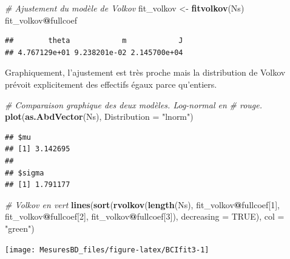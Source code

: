 \documentclass[
  11pt,
  french,
  a4paper,
  extrafontsizes,onecolumn,openright
  ]{memoir}
\newenvironment{Shaded}{\begin{snugshade}}{\end{snugshade}}
\newcommand{\AttributeTok}[1]{\textcolor[rgb]{0.13,0.29,0.53}{#1}}
\newcommand{\CommentTok}[1]{\textcolor[rgb]{0.56,0.35,0.01}{\textit{#1}}}
\newcommand{\ConstantTok}[1]{\textcolor[rgb]{0.56,0.35,0.01}{#1}}
\newcommand{\DecValTok}[1]{\textcolor[rgb]{0.00,0.00,0.81}{#1}}
\newcommand{\FunctionTok}[1]{\textcolor[rgb]{0.13,0.29,0.53}{\textbf{#1}}}
\newcommand{\NormalTok}[1]{#1}
\newcommand{\OtherTok}[1]{\textcolor[rgb]{0.56,0.35,0.01}{#1}}
\newcommand{\SpecialCharTok}[1]{\textcolor[rgb]{0.81,0.36,0.00}{\textbf{#1}}}
\newcommand{\StringTok}[1]{\textcolor[rgb]{0.31,0.60,0.02}{#1}}
\begin{document}
\begin{Shaded}
\begin{Highlighting}[]
\CommentTok{\# Ajustement du modèle de Volkov}
\NormalTok{fit\_volkov }\OtherTok{\textless{}{-}} \FunctionTok{fitvolkov}\NormalTok{(Ns)}
\NormalTok{fit\_volkov}\SpecialCharTok{@}\NormalTok{fullcoef}
\end{Highlighting}
\end{Shaded}

\begin{verbatim}
##        theta            m            J 
## 4.767129e+01 9.238201e-02 2.145700e+04
\end{verbatim}

\normalsize

Graphiquement, l'ajustement est très proche mais la distribution de Volkov prévoit explicitement des effectifs égaux parce qu'entiers.

\scriptsize

\begin{Shaded}
\begin{Highlighting}[]
\CommentTok{\# Comparaison graphique des deux modèles. Log{-}normal en}
\CommentTok{\# rouge.}
\FunctionTok{plot}\NormalTok{(}\FunctionTok{as.AbdVector}\NormalTok{(Ns), }\AttributeTok{Distribution =} \StringTok{"lnorm"}\NormalTok{)}
\end{Highlighting}
\end{Shaded}

\begin{verbatim}
## $mu
## [1] 3.142695
## 
## $sigma
## [1] 1.791177
\end{verbatim}

\begin{Shaded}
\begin{Highlighting}[]
\CommentTok{\# Volkov en vert}
\FunctionTok{lines}\NormalTok{(}\FunctionTok{sort}\NormalTok{(}\FunctionTok{rvolkov}\NormalTok{(}\FunctionTok{length}\NormalTok{(Ns), fit\_volkov}\SpecialCharTok{@}\NormalTok{fullcoef[}\DecValTok{1}\NormalTok{], fit\_volkov}\SpecialCharTok{@}\NormalTok{fullcoef[}\DecValTok{2}\NormalTok{],}
\NormalTok{    fit\_volkov}\SpecialCharTok{@}\NormalTok{fullcoef[}\DecValTok{3}\NormalTok{]), }\AttributeTok{decreasing =} \ConstantTok{TRUE}\NormalTok{), }\AttributeTok{col =} \StringTok{"green"}\NormalTok{)}
\end{Highlighting}
\end{Shaded}

\begin{center}\texttt{[image: MesuresBD\_files/figure-latex/BCIfit3-1]} \end{center}
\end{document}
